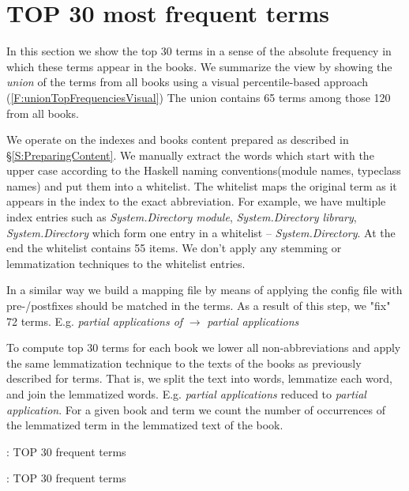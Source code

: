 \section{TOP 30 most frequent terms}
\label{S:Top30FrequentTerms}

In this section we show the top 30 terms in a sense of the absolute frequency in which these terms appear in the books. We summarize the view by showing the \textit{union} of the terms from all books using a visual percentile-based approach (\autoref{F:unionTopFrequenciesVisual}) The union contains 65 terms among those 120 from all books.  

We operate on the indexes and books content prepared as described in \S\ref{S:PreparingContent}. We manually extract the words which start with the upper case according to the Haskell naming conventions(module names, typeclass names) and put them into a whitelist. The whitelist maps the original term as it appears in the index to the exact abbreviation. For example, we have multiple index entries such as \textit{System.Directory module}, \textit{System.Directory library}, \textit{System.Directory} which form one entry in a whitelist -- \textit{System.Directory}. At the end the whitelist contains 55 items. We don't apply any stemming or lemmatization techniques to the whitelist entries.

In a similar way we build a mapping file by means of applying the config file with pre-/postfixes should be matched in the terms.
As a result of this step, we "fix" 72 terms. E.g. \textit{partial applications of} $\rightarrow$ \textit{partial applications}

To compute top 30 terms for each book we lower all non-abbreviations and apply the same lemmatization technique to the texts of the books as previously described for terms. That is, we split the text into words, lemmatize each word, and join the lemmatized words. E.g. \textit{partial applications} reduced to \textit{partial application}. For a given book and term we count the number of occurrences of the lemmatized term in the lemmatized text of the book.

\begin{table*}[h!]
\begin{minipage}[b]{0.5\linewidth}
\centering

\caption{\craftTag{}: TOP 30 frequent terms}
\label{T:top30FrequentTermsCraft}
\end{minipage}
\hspace{0.5cm}
\begin{minipage}[b]{0.5\linewidth}
\centering

\caption{\lyahTag{}: TOP 30 frequent terms}
\label{T:top30FrequentTermsLYAH}
\end{minipage}
\end{table*}

